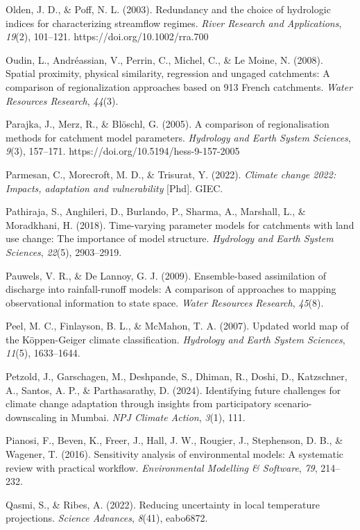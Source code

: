\documentclass[
]{article}
\begin{document}
Olden, J. D., \& Poff, N. L. (2003). Redundancy and the choice of
hydrologic indices for characterizing streamflow regimes. \emph{River
Research and Applications}, \emph{19}(2), 101--121.
https://doi.org/10.1002/rra.700

Oudin, L., Andréassian, V., Perrin, C., Michel, C., \& Le Moine, N.
(2008). Spatial proximity, physical similarity, regression and ungaged
catchments: A comparison of regionalization approaches based on 913
French catchments. \emph{Water Resources Research}, \emph{44}(3).

Parajka, J., Merz, R., \& Blöschl, G. (2005). A comparison of
regionalisation methods for catchment model parameters. \emph{Hydrology
and Earth System Sciences}, \emph{9}(3), 157--171.
https://doi.org/10.5194/hess-9-157-2005

Parmesan, C., Morecroft, M. D., \& Trisurat, Y. (2022). \emph{Climate
change 2022: Impacts, adaptation and vulnerability} {[}Phd{]}. GIEC.

Pathiraja, S., Anghileri, D., Burlando, P., Sharma, A., Marshall, L., \&
Moradkhani, H. (2018). Time-varying parameter models for catchments with
land use change: The importance of model structure. \emph{Hydrology and
Earth System Sciences}, \emph{22}(5), 2903--2919.

Pauwels, V. R., \& De Lannoy, G. J. (2009). Ensemble-based assimilation
of discharge into rainfall-runoff models: A comparison of approaches to
mapping observational information to state space. \emph{Water Resources
Research}, \emph{45}(8).

Peel, M. C., Finlayson, B. L., \& McMahon, T. A. (2007). Updated world
map of the Köppen-Geiger climate classification. \emph{Hydrology and
Earth System Sciences}, \emph{11}(5), 1633--1644.

Petzold, J., Garschagen, M., Deshpande, S., Dhiman, R., Doshi, D.,
Katzschner, A., Santos, A. P., \& Parthasarathy, D. (2024). Identifying
future challenges for climate change adaptation through insights from
participatory scenario-downscaling in Mumbai. \emph{NPJ Climate Action},
\emph{3}(1), 111.

Pianosi, F., Beven, K., Freer, J., Hall, J. W., Rougier, J., Stephenson,
D. B., \& Wagener, T. (2016). Sensitivity analysis of environmental
models: A systematic review with practical workflow. \emph{Environmental
Modelling \& Software}, \emph{79}, 214--232.

Qasmi, S., \& Ribes, A. (2022). Reducing uncertainty in local
temperature projections. \emph{Science Advances}, \emph{8}(41),
eabo6872.
\end{document}
